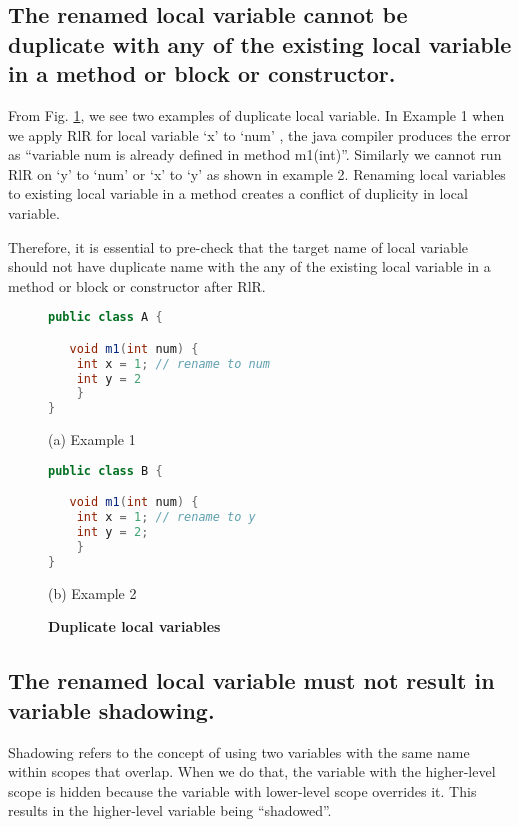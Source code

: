 \subsection{The renamed local variable cannot be duplicate with any of the existing local variable in a method or block or constructor.}
 
From Fig. \ref{figure:precond5_1}, we see two examples of duplicate local variable. In Example 1 when we apply RlR for local variable `x' to `num' , the java compiler produces the error as ``variable num is already defined in method m1(int)''. Similarly we cannot run RlR on  `y'  to `num' or `x'  to `y' as shown in example 2. Renaming local variables to existing local variable in a method creates a conflict of duplicity in local variable.

Therefore, it is essential to pre-check that the target name of local variable should not have duplicate name with the any of the existing local variable in a method or block or constructor after RlR.

\begin{figure}[th]
\centering
\begin{minipage}[t]{0.8\linewidth}
\begin{lstlisting}[language=java, basicstyle=\scriptsize\ttfamily,frame=single]
public class A {

   void m1(int num) {
	int x = 1; // rename to num
	int y = 2
    }
}
\end{lstlisting}
\centering(a) Example 1
\end{minipage}
\hfill
\begin{minipage}[t]{0.8\linewidth}
\begin{lstlisting}[language=java, basicstyle=\scriptsize\ttfamily,frame=single]
public class B {

   void m1(int num) {
	int x = 1; // rename to y
	int y = 2;
    }
}
\end{lstlisting}
\centering(b) Example 2
\end{minipage}
\caption{\textbf{Duplicate local variables}}
\label{figure:precond5_1}
\end{figure}

\subsection{The renamed local variable must not result in variable shadowing.}
Shadowing refers to the concept of using two variables with the same name within scopes that overlap. When we do that, the variable with the higher-level scope is hidden because the variable with lower-level scope overrides it. This results in the higher-level variable being ``shadowed''. 

